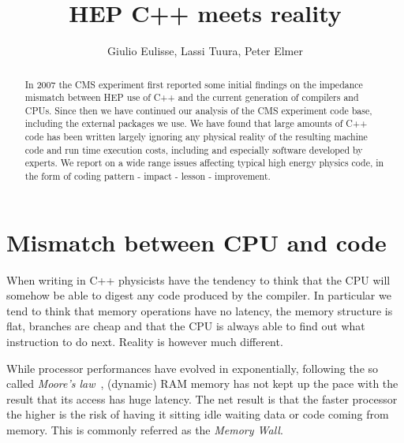 \documentclass[a4paper]{jpconf}
\def\revision{}
\def\myauthor{Author}			%
\def\mytitle{Title}
\def\myauthor{Giulio Eulisse, Lassi Tuura, Peter Elmer}
\def\mytitle{HEP C++ meets reality}
\begin{document}
\title{\mytitle}
\author{\myauthor}


\setlength{\parindent}{0pt}

\ifx\mycopyright\undefined
\else
	\textcopyright{} \mycopyright
\fi

\revision

\setlength{\parindent}{1em}

%
%


\setlength{\parindent}{1em}

\begin{abstract}
\label{abstract}

In 2007 the CMS experiment first reported some initial findings on the impedance mismatch between HEP use of C++ and the current generation of compilers and CPUs. Since then we have continued our analysis of the CMS experiment code base, including the external packages we use. We have found that large amounts of C++ code has been written largely ignoring any physical reality of the resulting machine code and run time execution costs, including and especially software developed by experts. We report on a wide range issues affecting typical high energy physics code, in the form of coding pattern - impact - lesson - improvement.


\end{abstract}

\section{Mismatch between CPU and code}
\label{mismatchbetweencpuandcode}

When writing in C++ physicists have the tendency to think that the CPU will somehow be able to digest any code produced by the compiler. In particular we tend to think that memory operations have no latency, the memory structure is flat, branches are cheap and that the CPU is always able to find out what instruction to do next.
Reality is however much different.


While processor performances have evolved in exponentially, following the so called {\itshape Moore's law}~\cite{Moore:1998p325}, (dynamic) RAM memory has not kept up the pace with the result that its access has huge latency. The net result is that the faster processor the higher is the risk of  having it sitting idle waiting data or code coming from memory. This is commonly referred as the {\itshape Memory Wall}.
\end{document}
